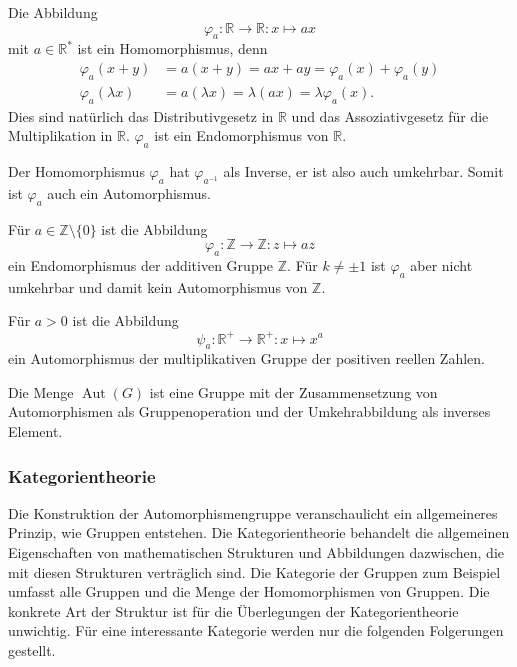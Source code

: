 \begin{beispiel}
Die Abbildung
\[
\varphi_a\colon \mathbb{R}\to\mathbb{R}
: x\mapsto a x
\]
mit $a\in\mathbb{R}^*$ ist ein Homomorphismus, denn
\begin{align*}
\varphi_a(x+y)
&=
a(x+y) = a x + a y = \varphi_a(x) + \varphi_a(y)
\\
\varphi_a(\lambda x)
&=
a(\lambda x)
=
\lambda (ax)
=
\lambda
\varphi_a(x).
\end{align*}
Dies sind natürlich das Distributivgesetz in $\mathbb{R}$ und das
Assoziativgesetz für die Multiplikation in $\mathbb{R}$.
$\varphi_a$ ist ein Endomorphismus von $\mathbb{R}$.

Der Homomorphismus $\varphi_a$ hat $\varphi_{a^{-1}}$ als Inverse,
er ist also auch umkehrbar.
Somit ist $\varphi_a$ auch ein Automorphismus.
\end{beispiel}

\begin{beispiel}
Für $a\in \mathbb{Z}\setminus\{0\}$ ist die Abbildung
\[
\varphi_a\colon \mathbb{Z}\to\mathbb{Z} : z\mapsto az
\]
ein Endomorphismus der additiven Gruppe $\mathbb{Z}$.
Für $k\ne \pm 1$ ist $\varphi_a$ aber nicht umkehrbar und damit
kein Automorphismus von $\mathbb{Z}$.
\end{beispiel}

\begin{beispiel}
Für $a>0$ ist die Abbildung
\[
\psi_a
\colon
\mathbb{R}^+ \to \mathbb{R}^+
:
x \mapsto x^a
\]
ein Automorphismus der multiplikativen Gruppe der positiven
reellen Zahlen.
\end{beispiel}

\begin{satz}
Die Menge $\operatorname{Aut}(G)$ ist eine Gruppe mit der Zusammensetzung
von Automorphismen als Gruppenoperation und der Umkehrabbildung als
inverses Element.
\end{satz}

%
%
\subsubsection{Kategorientheorie}
Die Konstruktion der Automorphismengruppe veranschaulicht ein allgemeineres
Prinzip, wie Gruppen entstehen.
Die Kategorientheorie behandelt die allgemeinen Eigenschaften von
mathematischen Strukturen und Abbildungen dazwischen, die mit diesen
Strukturen verträglich sind.
Die Kategorie der Gruppen zum Beispiel umfasst alle Gruppen und die
Menge der Homomorphismen von Gruppen.
Die konkrete Art der Struktur ist für die Überlegungen der Kategorientheorie
unwichtig.
Für eine interessante Kategorie werden nur die folgenden Folgerungen
gestellt.

